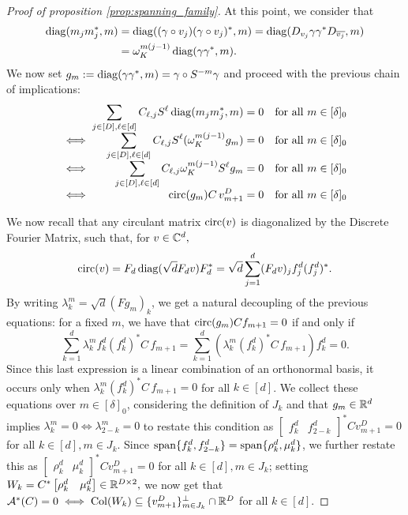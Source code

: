 \begin{proof}[Proof of proposition \ref{prop:spanning_family}]
  At this point, we consider that \begin{align} \operatorname{diag}(m_j m_j^*, m) &= \operatorname{diag}((\gamma \circ v_j) (\gamma \circ v_j)^*, m) = \operatorname{diag}(D_{v_j} \gamma \gamma^* D_{\overline{v_j}}, m) \\ &= \omega_K^{m(j - 1)} \operatorname{diag}(\gamma \gamma^*, m). \label{eq:gam_diag}\end{align}  We now set $g_m := \operatorname{diag}(\gamma \gamma^*, m) = \gamma \circ S^{-m} \gamma$ and proceed with the previous chain of implications:
  \[\arraycolsep=1.4pt%
  \begin{array}{c>{\displaystyle}rcl@{\quad}r}
    & \sum_{j \in [D], \ell \in [d]} C_{\ell, j} S^{\ell} \diag(m_j m_j^*, m) & = & 0 & \text{for all} \ m \in [\delta]_0 \\
    \iff & \sum_{j \in [D], \ell \in [d]} C_{\ell, j} S^{\ell} (\omega_K^{m(j - 1)} g_m) & = & 0 & \text{for all} \ m \in [\delta]_0 \\
    \iff & \sum_{j \in [D], \ell \in [d]} C_{\ell, j} \omega_K^{m(j - 1)} S^{\ell} g_m & = & 0 & \text{for all} \ m \in [\delta]_0 \\
    \iff & \circop(g_m) C \, v^D_{m+1} & = & 0 & \text{for all} \ m \in [\delta]_0 \\
  \end{array}\]

  We now recall that any circulant matrix $\operatorname{circ}(v)$ is diagonalized by the Discrete Fourier Matrix, such that, for $v \in \mathbb{C}^d,$ \[\operatorname{circ}(v) = F_d \operatorname{diag}(\sqrt{d} F_d v) F_d^* = \sqrt{d} \sum_{j = 1}^d (F_d v)_j f_j^d (f_j^d)^*.\]  By writing $\lambda_k^m = \sqrt{d}(F g_m)_k$, we get a natural decoupling of the previous equations: for a fixed $m$, we have that $\operatorname{circ}(g_m) C f_{m + 1} = 0$ if and only if \[\sum_{k = 1}^d \lambda_k^m f_k^d (f_k^d)^* C \, f_{m + 1} = \sum_{k = 1}^d (\lambda_k^m (f_k^d)^* C \, f_{m + 1}) f_k^d = 0.\]  Since this last expression is a linear combination of an orthonormal basis, it occurs only when $\lambda_k^m (f_k^d)^* C \, f_{m + 1} = 0$ for all $k \in [d]$.  We collect these equations over $m \in [\delta]_0$, considering the definition of $J_k$ and that $g_m \in \mathbb{R}^d$ implies $\lambda_k^m = 0 \iff \lambda_{2 - k}^m = 0$ to restate this condition as $\begin{bmatrix} f_k^d & f_{2 - k}^d \end{bmatrix}^* C v^D_{m + 1} = 0$ for all $k \in [d], m \in J_k$.  Since $\operatorname{span}\{f_k^d, f_{2 - k}^d\} = \operatorname{span}\{\rho_k^d, \mu_k^d\}$, we further restate this as $\begin{bmatrix} \rho_k^d & \mu_k^d \end{bmatrix}^* C v_{m + 1}^D = 0$ for all $k \in [d], m \in J_k$; setting $W_k = C^* \begin{bmatrix} \rho_k^d & \mu_k^d \end{bmatrix} \in \mathbb{R}^{D \times 2},$ we now get that $\mathcal{A}^*(C) = 0 \iff \operatorname{Col}(W_k) \subseteq \{v_{m + 1}^D\}_{m \in J_k}^\perp \cap \mathbb{R}^D$ for all $k \in [d]$.


\end{proof}
